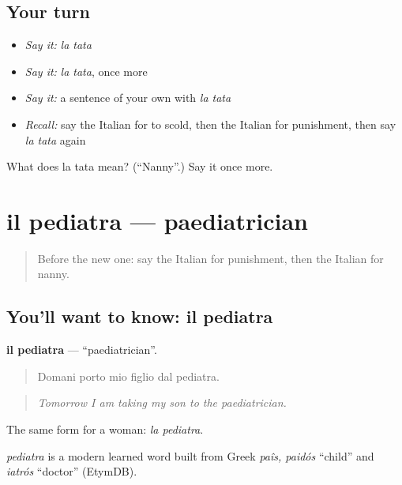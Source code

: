\subsection*{Your turn}
\begin{itemize}
\raggedright
  \item \emph{Say it:} \emph{la tata}
  \item \emph{Say it:} \emph{la tata}, once more
  \item \emph{Say it:} a sentence of your own with \emph{la tata}
  \item \emph{Recall:} say the Italian for to scold, then the Italian for punishment, then say \emph{la tata} again
\end{itemize}

\begin{tcolorbox}[breakable,colback=teal!4,colframe=teal!35!black,title={Before you move on}]
What does la tata mean? (\textquotedblleft{}Nanny\textquotedblright{}.) Say it once more.
\end{tcolorbox}
\section[il pediatra]{il pediatra — paediatrician}

\label{lesson:IT-C498-pediatra}



\begin{quote}
Before the new one: say the Italian for punishment, then the Italian for nanny.
\end{quote}

\subsection*{You'll want to know: il pediatra}
\textbf{il pediatra} — \textquotedblleft{}paediatrician\textquotedblright{}.

\begin{quote}
Domani porto mio figlio dal pediatra.
\end{quote}

\begin{quote}
\emph{Tomorrow I am taking my son to the paediatrician.}
\end{quote}

The same form for a woman: \emph{la pediatra}.

\begin{cousinweb}
\emph{pediatra} is a modern learned word built from Greek \emph{paîs, paidós} \textquotedblleft{}child\textquotedblright{} and \emph{iatrós} \textquotedblleft{}doctor\textquotedblright{} (EtymDB).
\end{cousinweb}

